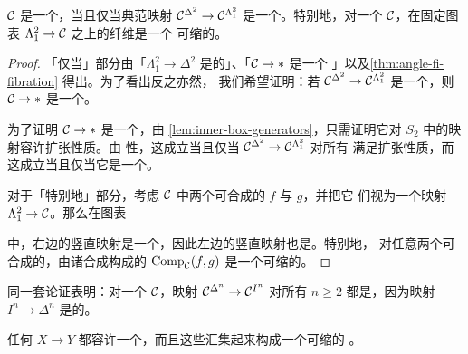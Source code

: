 \begin{corollary}\label{cor:trivial-fibration-characterization}
\trSimplicialSet{} $\mathcal{C}$ 是一个\trInfinityCategory{}，当且仅当典范映射
$\mathcal{C}^{\Delta^2} \to \mathcal{C}^{\Lambda^2_1}$ 是一个\trTrivialFibration{}。特别地，对一个%
\trInfinityCategory{} $\mathcal{C}$，在固定图表 $\Lambda^2_1 \to \mathcal{C}$ 之上的纤维是一个
可缩的\trKanComplex{}。
\end{corollary}

\begin{proof}
「仅当」部分由「$\Lambda^2_1 \to \Delta^2$ 是\trInnerAnodyne{}的」、「$\mathcal{C} \to \ast$ 是一个%
\trInnerFibration{}」以及\cref{thm:angle-fi-fibration} 得出。为了看出反之亦然，
我们希望证明：若 $\mathcal{C}^{\Delta^2} \to \mathcal{C}^{\Lambda^2_1}$ 是一个\trTrivialFibration{}，则
$\mathcal{C} \to \ast$ 是一个\trInnerFibration{}。

为了证明 $\mathcal{C} \to \ast$ 是一个\trInnerFibration{}，由%
\cref{lem:inner-box-generators}，只需证明它对 $S_2$ 中的映射容许扩张性质。由%
\trAdjunction{}性，这成立当且仅当 $\mathcal{C}^{\Delta^2} \to \mathcal{C}^{\Lambda^2_1}$ 对所有%
\trMonomorphism{}满足扩张性质，而这成立当且仅当它是一个\trTrivialFibration{}。

对于「特别地」部分，考虑 $\mathcal{C}$ 中两个可合成的\trMorphism{} $f$ 与 $g$，并把它
们视为一个映射 $\Lambda^2_1 \to \mathcal{C}$。那么在\trPullback{}图表
\begin{center}
\end{center}
中，右边的竖直映射是一个\trTrivialFibration{}，因此左边的竖直映射也是\trTrivialFibration{}。特别地，
对任意两个可合成的\trMorphism{}，由诸合成构成的\trSimplicialSet{}%
$\mathrm{Comp}_{\mathcal{C}}(f, g)$ 是一个可缩的\trKanComplex{}。
\end{proof}

\begin{remark}\label{rem:spine-trivial-fibration}
同一套论证表明：对一个\trInfinityCategory{} $\mathcal{C}$，映射
$\mathcal{C}^{\Delta^n} \to \mathcal{C}^{I^n}$ 对所有 $n \ge 2$ 都是\trTrivialFibration{}，因为映射
$I^n \to \Delta^n$ 是\trInnerAnodyne{}的。
\end{remark}

\begin{lemma}\label{lem:trivial-fibration-section}
任何\trTrivialFibration{} $X \to Y$ 都容许一个\trSectionMap{}，而且这些\trSectionMap{}汇集起来构成一个可缩的%
\trKanComplex{}。
\end{lemma}

